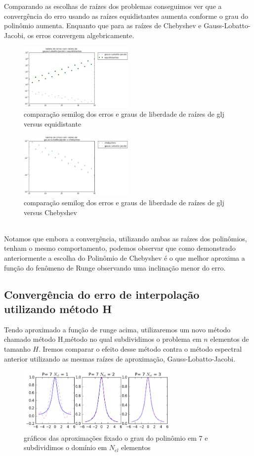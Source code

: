 Comparando as escolhas de raízes dos problemas conseguimos ver que a convergência do erro usando as raízes equidistantes aumenta conforme o grau do polinômio aumenta. Enquanto que para as raízes de Chebyshev e Gauss-Lobatto-Jacobi, os erros convergem algebricamente. 
\begin{figure}[!ht]
  \includegraphics[width=0.5\textwidth,center]{figuras/glj_equi.png}
  \caption{comparação semilog  dos erros e graus de liberdade de raízes de glj versus equidistante }
\end{figure}
\begin{figure}[!hb]
  \includegraphics[width=0.5\textwidth,center]{figuras/glj_cheb.png}
  \caption{comparação semilog  dos erros e graus de liberdade de raízes de glj versus Chebyshev}
\end{figure}
\\
Notamos que embora a convergência, utilizando ambas as raízes dos polinômios, tenham o mesmo comportamento, podemos observar que como demonstrado  anteriormente a escolha do Polinômio de Chebyshev é o que melhor aproxima a função do fenômeno de Runge observando uma inclinação menor do erro.

\subsection{Convergência do erro de interpolação utilizando método H}
 Tendo aproximado a função de runge acima, utilizaremos um novo método chamado método H,método no qual subdividimos o problema em $n$ elementos de tamanho $H$. Iremos comparar o efeito desse método contra o método espectral anterior utilizando as mesmas raízes de aproximação, Gauss-Lobatto-Jacobi.

\begin{figure}[H]
\centering
\includegraphics[width=0.7\textwidth,center]{figuras/interp_usando_FEM.png}
\caption{gráficos das aproximações fixado o grau do polinômio em 7 e subdividimos o domínio em $N_{el}$ elementos }
\end{figure}


